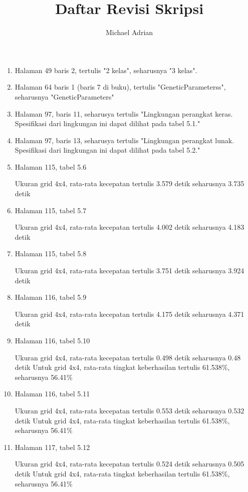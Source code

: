 \documentclass[11pt,a4paper,twoside,openright]{article}
\title{Daftar Revisi Skripsi}
\author{Michael Adrian}
\begin{document}
\maketitle

\begin{enumerate}
\item Halaman 49 baris 2, tertulis "2 kelas", seharusnya "3 kelas".
\item Halaman 64 baris 1 (baris 7 di buku), tertulis "GeneticParameterss", seharusnya "GeneticParameters"
\item Halaman 97, baris 11, seharusya tertulis "Lingkungan perangkat keras. Spesifikasi dari lingkungan ini dapat dilihat pada tabel 5.1."
\item Halaman 97, baris 13, seharusya tertulis "Lingkungan perangkat lunak. Spesifikasi dari lingkungan ini dapat dilihat pada tabel 5.2."
\item Halaman 115, tabel 5.6

Ukuran grid 4x4, rata-rata kecepatan tertulis 3.579 detik seharusnya 3.735 detik

\item Halaman 115, tabel 5.7

Ukuran grid 4x4, rata-rata kecepatan tertulis 4.002 detik seharusnya 4.183 detik

\item Halaman 115, tabel 5.8

Ukuran grid 4x4, rata-rata kecepatan tertulis 3.751 detik seharusnya 3.924 detik

\item Halaman 116, tabel 5.9

Ukuran grid 4x4, rata-rata kecepatan tertulis 4.175 detik seharusnya 4.371 detik

\item Halaman 116, tabel 5.10

Ukuran grid 4x4, rata-rata kecepatan tertulis 0.498 detik seharusnya 0.48 detik
Untuk grid 4x4, rata-rata tingkat keberhasilan tertulis 61.538\%, seharusnya 56.41\%

\item Halaman 116, tabel 5.11

Ukuran grid 4x4, rata-rata kecepatan tertulis 0.553 detik seharusnya 0.532 detik
Untuk grid 4x4, rata-rata tingkat keberhasilan tertulis 61.538\%, seharusnya 56.41\%

\item Halaman 117, tabel 5.12

Ukuran grid 4x4, rata-rata kecepatan tertulis 0.524 detik seharusnya 0.505 detik
Untuk grid 4x4, rata-rata tingkat keberhasilan tertulis 61.538\%, seharusnya 56.41\%


\end{enumerate}
\end{document}
